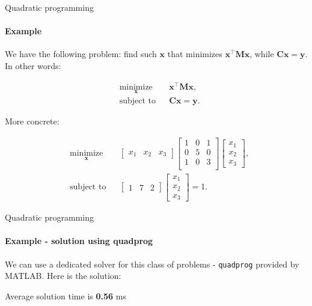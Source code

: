 \documentclass{beamer}
\begin{document}
\begin{frame}{Quadratic programming}
\framesubtitle{Example}
\begin{flushleft}

We have the following problem: find such $\mathbf x$ that minimizes $\mathbf x^\top \mathbf M \mathbf x$, while $\mathbf C \mathbf x = \mathbf y$. In other words:

\begin{equation} \label{eq:Example1:1}
\begin{aligned}
& \underset{\mathbf  x}{\text{minimize}}
& & \mathbf x^\top \mathbf M \mathbf x, \\
& \text{subject to}
& & \mathbf C \mathbf x = \mathbf y.
\end{aligned}
\end{equation}

More concrete:

\begin{equation} \label{eq:Example1:2}
\begin{aligned}
& \underset{\mathbf  x}{\text{minimize}}
& & \begin{bmatrix} x_1 & x_2 & x_3 \end{bmatrix}
\begin{bmatrix}  
   1 & 0 & 1 \\
   0 & 5 & 0 \\
   1 & 0 & 3 \\
   \end{bmatrix}
\begin{bmatrix} x_1 \\ x_2 \\ x_3 \end{bmatrix}, \\
& \text{subject to}
& & \begin{bmatrix} 1 & 7 & 2 \end{bmatrix}
\begin{bmatrix} x_1 \\ x_2 \\ x_3 \end{bmatrix}
= 1.
\end{aligned}
\end{equation}

\end{flushleft}
\end{frame}




\begin{frame}{Quadratic programming}
\framesubtitle{Example - solution using quadprog}
\begin{flushleft}

We can use a dedicated solver for this class of problems - \texttt{quadprog} provided by MATLAB. Here is the solution:



Average solution time is \textbf{0.56} ms

\end{flushleft}
\end{frame}
\end{document}
